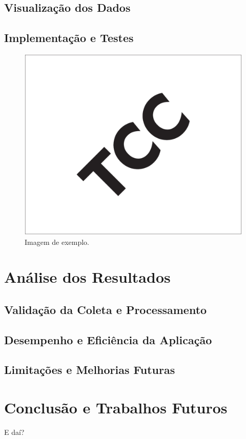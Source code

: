 \documentclass[12pt, %
openright, 
oneside, %
a4paper,    %
brazil]{facom-ufu-abntex2}
\begin{document}
\section{Visualização dos Dados}
\section{Implementação e Testes}


\begin{figure}[!ht]
    \centering
	\includegraphics[width=0.55\linewidth]{imagemExemplo.pdf}
	\caption[Isso é o que aparece no sumário]{Imagem de exemplo.}
	\label{fig:graficosVariandoTamanhoRede}
\end{figure}


\chapter{Análise dos Resultados}
\section{Validação da Coleta e Processamento}
\section{Desempenho e Eficiência da Aplicação}
\section{Limitações e Melhorias Futuras}





\chapter{Conclusão e Trabalhos Futuros}
E daí?
\end{document}
